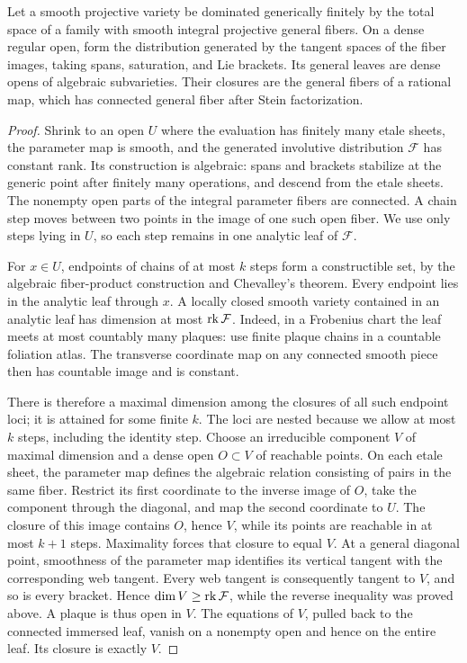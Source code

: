 \begin{lemma}\label{ex:web}
Let a smooth projective variety be dominated generically finitely by
the total space of a family with smooth integral projective general
fibers. On a dense regular open, form the distribution generated by
the tangent spaces of the fiber images, taking spans, saturation,
and Lie brackets. Its general leaves are dense opens of algebraic
subvarieties. Their closures are the general fibers of a rational
map, which has connected general fiber after Stein factorization.
\end{lemma}
\begin{proof}
Shrink to an open \(U\) where the evaluation has finitely many etale
sheets, the parameter map is smooth, and the generated involutive
distribution \(\mathcal F\) has constant rank. Its construction is
algebraic: spans and brackets stabilize at the generic point after
finitely many operations, and descend from the etale sheets. The
nonempty open parts of the integral parameter fibers are connected.
A chain step moves between two points in the image of one such
open fiber. We use only steps lying in \(U\), so each step remains
in one analytic leaf of \(\mathcal F\).

For \(x\in U\), endpoints of chains of at most \(k\) steps form a
constructible set, by the algebraic fiber-product construction and
Chevalley's theorem. Every endpoint lies in the analytic leaf
through \(x\). A locally closed smooth variety contained in an
analytic leaf has dimension at most \(\operatorname{rk}\mathcal F\). Indeed, in a
Frobenius chart the leaf meets at most countably many plaques: use
finite plaque chains in a countable foliation atlas. The transverse
coordinate map on any connected smooth piece then has countable
image and is constant.

There is therefore a maximal dimension among the closures of all
such endpoint loci; it is attained for some finite \(k\). The loci
are nested because we allow at most \(k\) steps, including the
identity step. Choose an irreducible component \(V\) of maximal
dimension and a dense open \(O\subset V\) of reachable points.
On each etale sheet, the parameter map defines the algebraic
relation consisting of pairs in the same fiber. Restrict its
first coordinate to the inverse image of \(O\), take the component
through the diagonal, and map the second coordinate to \(U\).
The closure of this image contains \(O\), hence \(V\), while its
points are reachable in at most \(k+1\) steps. Maximality forces
that closure to equal \(V\). At a general
diagonal point, smoothness of the parameter map identifies its
vertical tangent with the corresponding web tangent. Every web
tangent is consequently tangent to \(V\), and so is every bracket. Hence
\(\dim V\geq\operatorname{rk}\mathcal F\), while the reverse inequality was proved
above. A plaque is thus open in \(V\). The equations of \(V\),
pulled back to the connected immersed leaf, vanish on a nonempty
open and hence on the entire leaf. Its closure is exactly \(V\).


\end{proof}

